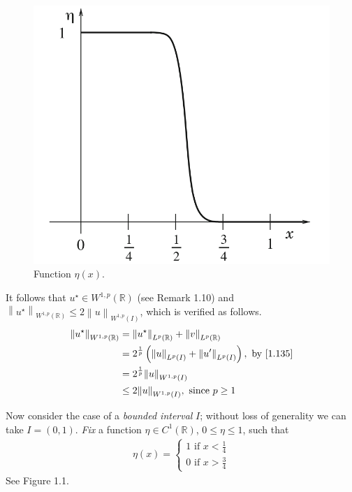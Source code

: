 \documentclass[a4paper,oneside]{article}
\numberwithin{equation}{section}
\begin{document}
\begin{figure}[H]
\centering
\includegraphics[scale=0.35]{1}
\caption{Function $\eta \left(x\right)$.}
\end{figure}
It follows that $u^{\star} \in W^{1,p}\left(\mathbb{R}\right)$ (see Remark 1.10) and ${\left\| {u^{\star}} \right\|_{{W^{1,p}}\left( \mathbb{R}  \right)}} \le 2{\left\| u \right\|_{{W^{1,p}}\left( I \right)}}$, which is verified as follows.
\begin{align}
{\left\| {u^{\star} } \right\|_{{W^{1,p}}\left( \mathbb{R} \right)}} &= {\left\| {u^{\star} } \right\|_{{L^p}\left( \mathbb{R} \right)}} + {\left\| v \right\|_{{L^p}\left( \mathbb{R} \right)}}\\
 &= {2^{\frac{1}{p}}}\left( {{{\left\| u \right\|}_{{L^p}\left( I \right)}} + {{\left\| {u'} \right\|}_{{L^p}\left( I \right)}}} \right),\mbox{ by \eqref{1.135}}\\
 & = {2^{\frac{1}{p}}}{\left\| u \right\|_{{W^{1,p}}\left( I \right)}}\\
 &\le 2{\left\| u \right\|_{{W^{1,p}}\left( I \right)}}, \mbox{ since } p \ge 1
\end{align}

Now consider the case of a \textit{bounded interval} $I$; without loss of generality we can take $I=\left(0,1\right)$. \textit{Fix} a function $\eta \in C^1\left(\mathbb{R}\right)$, $0\le \eta \le 1$, such that
\begin{align}
\label{1.150}
\eta \left( x \right) = \left\{ {\begin{array}{*{20}{c}}
{1\mbox{ if } x < \frac{1}{4}}\\
{0\mbox{ if } x > \frac{3}{4}}
\end{array}} \right.
\end{align}
See Figure 1.1.
\end{document}
